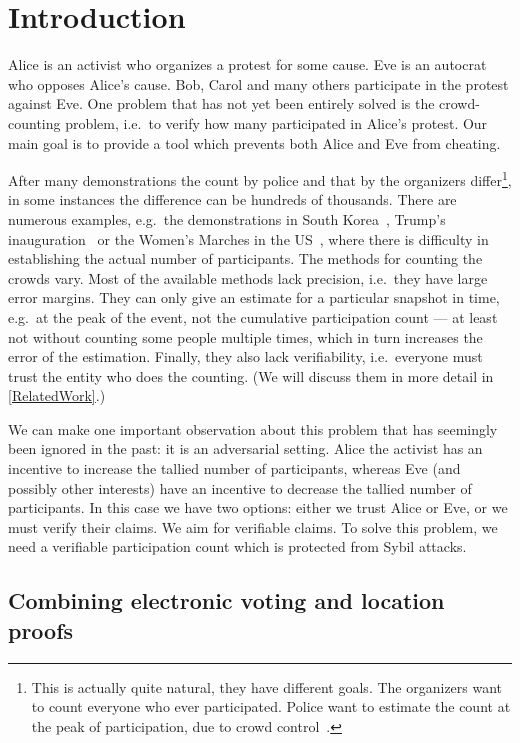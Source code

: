 \section{Introduction}%
\label{Introduction}

Alice is an activist who organizes a protest for some cause.
Eve is an autocrat who opposes Alice's cause.
Bob, Carol and many others participate in the protest against Eve.
One problem that has not yet been entirely solved is the crowd-counting 
problem, i.e.\ to verify how many participated in Alice's protest.
Our main goal is to provide a tool which prevents both Alice and Eve from 
cheating.

After many demonstrations the count by police and that by the organizers 
differ\footnote{%
  This is actually quite natural, they have different goals.
  The organizers want to count everyone who ever participated.
  Police want to estimate the count at the peak of participation, due to crowd 
  control~\cite{2016DemonstrationsInSeoul}.
}, in some instances the difference can be hundreds of thousands.
There are numerous examples, e.g.\ the demonstrations in South 
Korea~\cite{2016DemonstrationsInSeoul}, Trump's 
inauguration~\cite{HowWillWeKnowTrumpInauguralCrowdSize} or the Women's Marches 
in the US~\cite{2017WomensMarchesInUS}, where there is difficulty in 
establishing the actual number of participants.
The methods for counting the crowds vary.
Most of the available methods lack precision, i.e.\ they have large error 
margins.
They can only give an estimate for a particular snapshot in time, e.g.\ at the 
peak of the event, not the cumulative participation count --- at least not 
without counting some people multiple times, which in turn increases the error 
of the estimation.
Finally, they also lack verifiability, i.e.\ everyone must trust the entity who
does the counting.
(We will discuss them in more detail in \cref{RelatedWork}.)

We can make one important observation about this problem that has seemingly been 
ignored in the past: it is an adversarial setting.
Alice the activist has an incentive to increase the tallied number of 
participants, whereas Eve (and possibly other interests) have an incentive to 
decrease the tallied number of participants.
In this case we have two options:
either we trust Alice or Eve, or we must verify their claims.
We aim for verifiable claims.
To solve this problem, we need a verifiable participation count which is 
protected from Sybil attacks.

\subsection{Combining electronic voting and location proofs}

